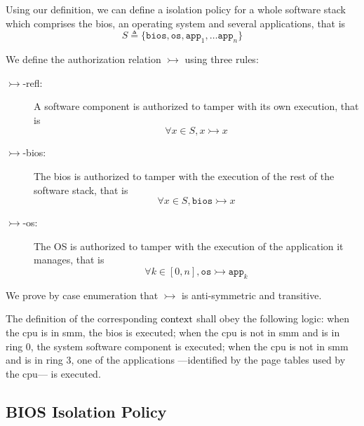 \begin{example}
  \label{example:speccert2:isolation}
  Using our definition, we can define a isolation policy for a whole software
  stack which comprises the \ac{bios}, an operating system and several
  applications, that is
  \[
    S \triangleq \{ \mathtt{bios}, \mathtt{os}, \mathtt{app}_1, \dots
    \mathtt{app}_n \}
  \]

  We define the authorization relation $\rightarrowtail$ using three rules:
  \begin{description}
  \item [\(\rightarrowtail\)-refl:] A software component is authorized to tamper
    with its own execution, that is
    \[ \forall x \in S, x \rightarrowtail x \]
  \item [\(\rightarrowtail\)-bios:] The \ac{bios} is authorized to tamper with
    the execution of the rest of the software stack, that is
    \[ \forall x \in S, \mathtt{bios} \rightarrowtail x \]
  \item [\(\rightarrowtail\)-os:] The OS is authorized to tamper with the
    execution of the application it manages, that is
    \[ \forall k \in [0, n], \mathtt{os} \rightarrowtail \mathtt{app}_k \]
  \end{description}

  We prove by case enumeration that $\rightarrowtail$ is anti-symmetric and
  transitive.

  The definition of the corresponding $\mathrm{context}$  shall obey the following logic: when the
  \ac{cpu} is in \ac{smm}, the \ac{bios} is executed; when the \ac{cpu} is not
  in \ac{smm} and is in ring 0, the system software component is executed; when
  the \ac{cpu} is not in \ac{smm} and is in ring 3, one of the applications
  ---identified by the page tables used by the \ac{cpu}--- is executed.
\end{example}

\subsection{BIOS Isolation Policy}
\label{subsec:speccert:biossec}


